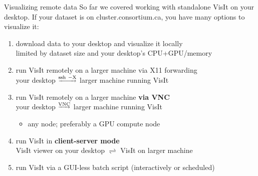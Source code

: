 \begin{frame}{Visualizing remote data}
  So far we covered working with standalone VisIt on your desktop. If your dataset is on
  cluster.consortium.ca, you have many options to visualize it:\medskip
  \begin{enumerate}\setlength{\itemsep}{2mm}
  \item download data to your desktop and visualize it locally\\
    {\color{red} limited by dataset size and your desktop's CPU+GPU/memory}
  \item run VisIt remotely on a larger machine via X11 forwarding\\
    {\color{blue} your desktop $^{\underrightarrow{\rm ssh~-X}}$ larger machine running VisIt}
  \item run VisIt remotely on a larger machine {\bf via VNC}\\
    {\color{blue} your desktop $^{\underrightarrow{\rm VNC}}$ larger machine running VisIt}
    \begin{itemize}\setlength{\itemsep}{0mm}
    \item any node; preferably a GPU compute node
    \end{itemize}
  \item run VisIt in {\bf client-server mode}\\
    {\color{blue} VisIt viewer on your desktop $\rightleftharpoons$ VisIt on larger machine}
  \item run VisIt via a GUI-less batch script (interactively or scheduled)
  \end{enumerate}
\end{frame}

